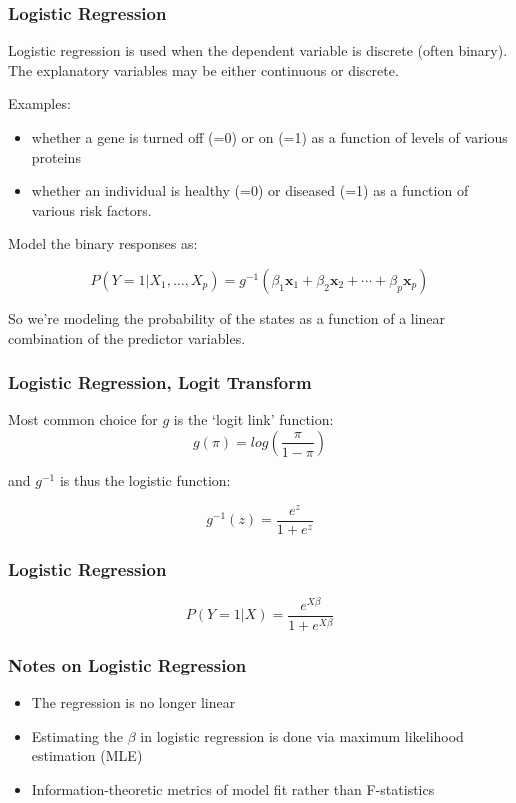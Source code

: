 \documentclass{beamer}
\newcommand{\Mtx}[1]{\ensuremath{\mathbf{#1}}}
\begin{document}
\begin{frame}
  \frametitle{Logistic Regression}
  
Logistic regression is used when the dependent variable is discrete (often binary).  The explanatory variables may be either continuous or discrete.
\medskip

Examples:
\begin{itemize}
\item whether a gene is turned off (=0) or on (=1) as a function of levels of various proteins
\item whether an individual is healthy (=0) or diseased (=1) as a function of various risk factors.
\end{itemize}

Model the binary responses as:

\[P(Y = 1|X_1,\ldots,X_p) = g^{-1}(\beta_1\Mtx{x}_1 + \beta_2\Mtx{x}_2 + \cdots + \beta_p\Mtx{x}_p)
\]

So we're modeling the probability of the states as a function of a linear combination of the predictor variables.

\end{frame}

\begin{frame}
  \frametitle{Logistic Regression, Logit Transform}

Most common choice for $g$ is the `logit link' function:
\[
g(\pi) = log\left( \frac{\pi}{1-\pi} \right) 
\]

and $g^{-1}$ is thus the logistic function:

\[
g^{-1}(z) = \frac{e^z}{1+e^z}
\]

\end{frame}

\begin{frame}
  \frametitle{Logistic Regression}

\[
P(Y = 1 | X) = \frac{e^{X\beta}}{1+e^{X\beta}}
\]

\bigskip

\begin{center}
\end{center}

\end{frame}

\begin{frame}
  \frametitle{Notes on Logistic Regression}

\begin{itemize}
    \item The regression is no longer linear
    \item Estimating the $\beta$ in logistic regression is done via maximum likelihood estimation (MLE)
    \item Information-theoretic metrics of model fit rather than F-statistics
\end{itemize}

\end{frame}
\end{document}
